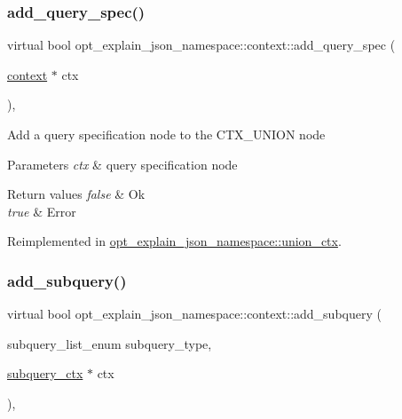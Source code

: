\subsubsection{\texorpdfstring{add\+\_\+query\+\_\+spec()}{add\_query\_spec()}}
{\footnotesize\ttfamily virtual bool opt\+\_\+explain\+\_\+json\+\_\+namespace\+::context\+::add\+\_\+query\+\_\+spec (\begin{DoxyParamCaption}\item[{\mbox{\hyperlink{classopt__explain__json__namespace_1_1context}{context}} $\ast$}]{ctx }\end{DoxyParamCaption})\hspace{0.3cm}{\ttfamily [inline]}, {\ttfamily [virtual]}}

Add a query specification node to the C\+T\+X\+\_\+\+U\+N\+I\+ON node


\begin{DoxyParams}{Parameters}
{\em ctx} & query specification node\\
\hline
\end{DoxyParams}

\begin{DoxyRetVals}{Return values}
{\em false} & Ok \\
\hline
{\em true} & Error \\
\hline
\end{DoxyRetVals}


Reimplemented in \mbox{\hyperlink{classopt__explain__json__namespace_1_1union__ctx_a8b491562c9f7455653605a74295b456d}{opt\+\_\+explain\+\_\+json\+\_\+namespace\+::union\+\_\+ctx}}.

\mbox{\label{classopt__explain__json__namespace_1_1context_ad9df2d2b16093c51e1c5557227b2fd56}} 
\subsubsection{\texorpdfstring{add\+\_\+subquery()}{add\_subquery()}}
{\footnotesize\ttfamily virtual bool opt\+\_\+explain\+\_\+json\+\_\+namespace\+::context\+::add\+\_\+subquery (\begin{DoxyParamCaption}\item[{subquery\+\_\+list\+\_\+enum}]{subquery\+\_\+type,  }\item[{\mbox{\hyperlink{classopt__explain__json__namespace_1_1subquery__ctx}{subquery\+\_\+ctx}} $\ast$}]{ctx }\end{DoxyParamCaption})\hspace{0.3cm}{\ttfamily [inline]}, {\ttfamily [virtual]}}

